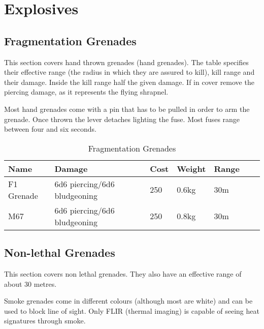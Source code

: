 \section{Explosives}
\label{sec:9-Explosives}

\subsection{Fragmentation Grenades}
\label{sub:9-Fragmentation Grenades}

This section covers hand thrown grenades (hand grenades). The table specifies
their effective range (the radius in which they are assured to kill), kill
range and their damage. Inside the kill range half the given damage. If in
cover remove the piercing damage, as it represents the flying shrapnel.

Most hand grenades come with a pin that has to be pulled in order to arm the
grenade. Once thrown the lever detaches lighting the fuse. Most fuses range
between four and six seconds.

\begin{table}
  \caption{Fragmentation Grenades}
  \label{tab:Frag}
  \begin{center}
    \begin{tabular}{| l | l | l | l | l | l | l |}

      \hline
      \textbf{Name} & \textbf{Damage} & \textbf{Cost} &
      \textbf{Weight} & \textbf{Range} \\ \hline

      F1 Grenade  & 6d6 piercing/6d6 bludgeoning & 250 & 0.6kg & 30m \\ \hline
      M67         & 6d6 piercing/6d6 bludgeoning & 250 & 0.8kg & 30m \\ \hline

    \end{tabular}
  \end{center}
\end{table}

\subsection{Non-lethal Grenades}
\label{sub:9-Non-lethal Grenades}

This section covers non lethal grenades. They also have an effective range
of about 30 metres.

Smoke grenades come in different colours (although most are white) and can be
used to block line of sight. Only FLIR (thermal imaging) is capable of seeing
heat signatures through smoke.

